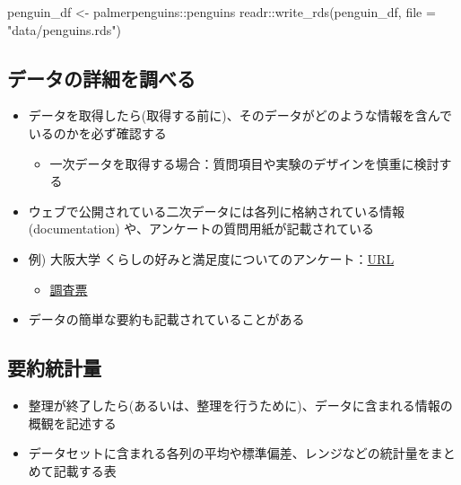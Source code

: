 \documentclass[
]{ltjsarticle}
\newenvironment{Shaded}{\begin{snugshade}}{\end{snugshade}}
\newcommand{\AttributeTok}[1]{\textcolor[rgb]{0.77,0.63,0.00}{#1}}
\newcommand{\FunctionTok}[1]{\textcolor[rgb]{0.00,0.00,0.00}{#1}}
\newcommand{\NormalTok}[1]{#1}
\newcommand{\OtherTok}[1]{\textcolor[rgb]{0.56,0.35,0.01}{#1}}
\newcommand{\SpecialCharTok}[1]{\textcolor[rgb]{0.00,0.00,0.00}{#1}}
\newcommand{\StringTok}[1]{\textcolor[rgb]{0.31,0.60,0.02}{#1}}
\providecommand{\tightlist}{%
  \setlength{\itemsep}{0pt}\setlength{\parskip}{0pt}}
\begin{document}
\begin{Shaded}
\begin{Highlighting}[]
\NormalTok{penguin\_df }\OtherTok{\textless{}{-}}\NormalTok{ palmerpenguins}\SpecialCharTok{::}\NormalTok{penguins}
\NormalTok{readr}\SpecialCharTok{::}\FunctionTok{write\_rds}\NormalTok{(penguin\_df, }\AttributeTok{file =} \StringTok{"data/penguins.rds"}\NormalTok{)}
\end{Highlighting}
\end{Shaded}

\hypertarget{ux30c7ux30fcux30bfux306eux8a73ux7d30ux3092ux8abfux3079ux308b}{%
\subsection{データの詳細を調べる}\label{ux30c7ux30fcux30bfux306eux8a73ux7d30ux3092ux8abfux3079ux308b}}

\begin{itemize}
\tightlist
\item
  データを取得したら(取得する前に)、そのデータがどのような情報を含んでいるのかを必ず確認する

  \begin{itemize}
  \tightlist
  \item
    一次データを取得する場合：質問項目や実験のデザインを慎重に検討する
  \end{itemize}
\item
  ウェブで公開されている二次データには各列に格納されている情報
  (documentation) や、アンケートの質問用紙が記載されている
\item
  例) 大阪大学
  くらしの好みと満足度についてのアンケート：\href{https://www.iser.osaka-u.ac.jp/survey_data/panelsummary.html}{URL}

  \begin{itemize}
  \tightlist
  \item
    \href{https://www.iser.osaka-u.ac.jp/survey_data/doc/japan/questionnaire/japanese/2021QuestionnaireJAPAN.pdf}{調査票}
  \end{itemize}
\item
  データの簡単な要約も記載されていることがある
\end{itemize}

\hypertarget{ux8981ux7d04ux7d71ux8a08ux91cf}{%
\subsection{要約統計量}\label{ux8981ux7d04ux7d71ux8a08ux91cf}}

\begin{itemize}
\tightlist
\item
  整理が終了したら(あるいは、整理を行うために)、データに含まれる情報の概観を記述する
\item
  データセットに含まれる各列の平均や標準偏差、レンジなどの統計量をまとめて記載する表
\end{itemize}
\end{document}
